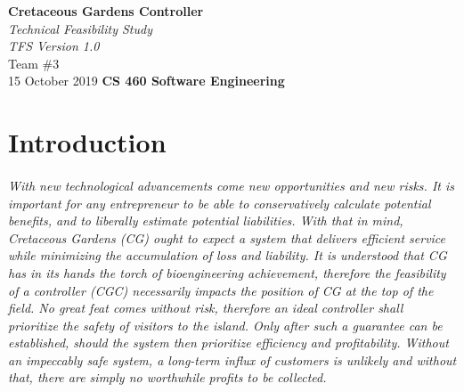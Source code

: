 \documentclass[12pt]{article}
\begin{document}
\begin{titlepage}
\begin{flushleft}
\vspace*{1cm}
\Huge
\textbf{Cretaceous Gardens Controller}\\
\vspace{1cm}
\Huge
\textit{Technical Feasibility Study}\\
\vspace{1cm}
\Large
\textit{TFS Version 1.0}\\
\vspace{5cm}
\LARGE
Team \#3\\
15 October 2019
\vfill
\Huge
\textbf{CS 460 Software Engineering}
\end{flushleft}
\end{titlepage}
\normalsize
\tableofcontents
\newpage

\section{Introduction}
\paragraph{} \textit{With new technological advancements come new opportunities and new risks. It is important for
 any entrepreneur to be able to conservatively calculate potential benefits, and to liberally
 estimate potential liabilities. With that in mind, Cretaceous Gardens (CG) ought to expect a system
 that delivers efficient service while minimizing the accumulation of loss and liability. It 
 is understood that CG has in its hands the torch of bioengineering achievement, therefore the
 feasibility of a controller (CGC) necessarily impacts the position of CG at the top of the field.
 No great feat comes without risk, therefore an ideal controller shall prioritize the safety of
 visitors to the island. Only after such a guarantee can be established, should the system then
 prioritize efficiency and profitability. Without an impeccably safe system, a long-term influx 
 of customers is unlikely and without that, there are simply no worthwhile profits to be collected.}
 
\end{document}

